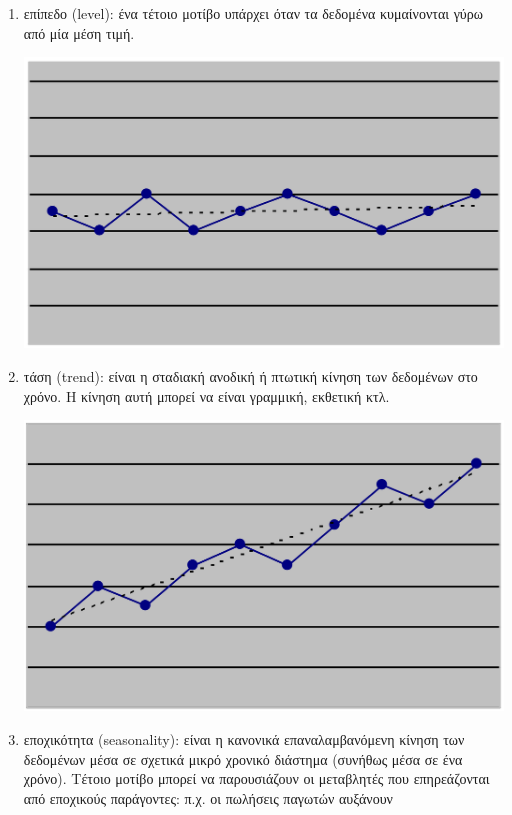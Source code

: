 \begin{enumerate}
\item επίπεδο (level): ένα τέτοιο μοτίβο υπάρχει όταν τα δεδομένα κυμαίνονται
γύρω από μία μέση τιμή.\\
\begin{center}
\includegraphics[scale=0.2]{level.png}\\
\end{center}
\item τάση (trend): είναι η σταδιακή ανοδική ή πτωτική κίνηση των δεδομένων στο
χρόνο. Η κίνηση αυτή μπορεί να είναι γραμμική, εκθετική κτλ.\\
\begin{center}
\includegraphics[scale=0.2]{trend.png}
\end{center}
\item εποχικότητα (seasonality): είναι η κανονικά επαναλαμβανόμενη κίνηση των
δεδομένων μέσα σε σχετικά μικρό χρονικό διάστημα (συνήθως μέσα σε ένα
χρόνο). Τέτοιο μοτίβο μπορεί να παρουσιάζουν οι μεταβλητές που
επηρεάζονται από εποχικούς παράγοντες: π.χ. οι πωλήσεις παγωτών αυξάνουν

\end{enumerate}
